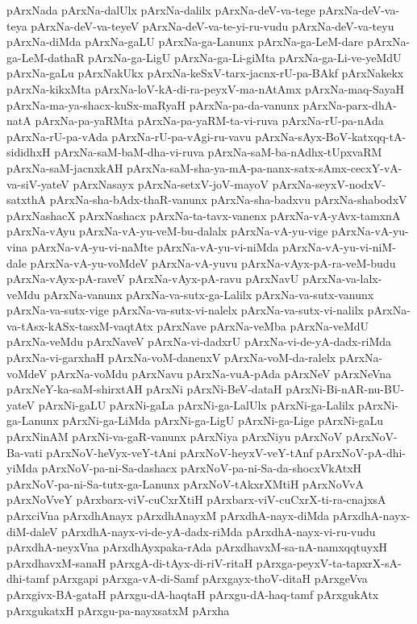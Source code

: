 {pArxNada
pArxNa-dalUlx
pArxNa-dalilx
pArxNa-deV-va-tege
pArxNa-deV-va-teya
pArxNa-deV-va-teyeV
pArxNa-deV-va-te-yi-ru-vudu
pArxNa-deV-va-teyu
pArxNa-diMda
pArxNa-gaLU
pArxNa-ga-Lanunx
pArxNa-ga-LeM-dare
pArxNa-ga-LeM-dathaR
pArxNa-ga-LigU
pArxNa-ga-Li-giMta
pArxNa-ga-Li-ve-yeMdU
pArxNa-gaLu
pArxNakUkx
pArxNa-keSxV-tarx-jacnx-rU-pa-BAkf
pArxNakekx
pArxNa-kikxMta
pArxNa-loV-kA-di-ra-peyxV-ma-nAtAmx
pArxNa-maq-SayaH
pArxNa-ma-ya-shacx-kuSx-maRyaH
pArxNa-pa-da-vanunx
pArxNa-parx-dhA-natA
pArxNa-pa-yaRMta
pArxNa-pa-yaRM-ta-vi-ruva
pArxNa-rU-pa-nAda
pArxNa-rU-pa-vAda
pArxNa-rU-pa-vAgi-ru-vavu
pArxNa-sAyx-BoV-katxqq-tA-sididhxH
pArxNa-saM-baM-dha-vi-ruva
pArxNa-saM-ba-nAdhx-tUpxvaRM
pArxNa-saM-jacnxkAH
pArxNa-saM-sha-ya-mA-pa-nanx-satx-sAmx-cecxY-vA-va-siV-yateV
pArxNasayx
pArxNa-setxV-joV-mayoV
pArxNa-seyxV-nodxV-satxthA
pArxNa-sha-bAdx-thaR-vanunx
pArxNa-sha-badxvu
pArxNa-shabodxV
pArxNashacX
pArxNashacx
pArxNa-ta-tavx-vanenx
pArxNa-vA-yAvx-tamxnA
pArxNa-vAyu
pArxNa-vA-yu-veM-bu-dalalx
pArxNa-vA-yu-vige
pArxNa-vA-yu-vina
pArxNa-vA-yu-vi-naMte
pArxNa-vA-yu-vi-niMda
pArxNa-vA-yu-vi-niM-dale
pArxNa-vA-yu-voMdeV
pArxNa-vA-yuvu
pArxNa-vAyx-pA-ra-veM-budu
pArxNa-vAyx-pA-raveV
pArxNa-vAyx-pA-ravu
pArxNavU
pArxNa-va-lalx-veMdu
pArxNa-vanunx
pArxNa-va-sutx-ga-Lalilx
pArxNa-va-sutx-vanunx
pArxNa-va-sutx-vige
pArxNa-va-sutx-vi-nalelx
pArxNa-va-sutx-vi-nalilx
pArxNa-va-tAsx-kASx-tasxM-vaqtAtx
pArxNave
pArxNa-veMba
pArxNa-veMdU
pArxNa-veMdu
pArxNaveV
pArxNa-vi-dadxrU
pArxNa-vi-de-yA-dadx-riMda
pArxNa-vi-garxhaH
pArxNa-voM-danenxV
pArxNa-voM-da-ralelx
pArxNa-voMdeV
pArxNa-voMdu
pArxNavu
pArxNa-vuA-pAda
pArxNeV
pArxNeVna
pArxNeY-ka-saM-shirxtAH
pArxNi
pArxNi-BeV-dataH
pArxNi-Bi-nAR-nu-BU-yateV
pArxNi-gaLU
pArxNi-gaLa
pArxNi-ga-LalUlx
pArxNi-ga-Lalilx
pArxNi-ga-Lanunx
pArxNi-ga-LiMda
pArxNi-ga-LigU
pArxNi-ga-Lige
pArxNi-gaLu
pArxNinAM
pArxNi-va-gaR-vanunx
pArxNiya
pArxNiyu
pArxNoV
pArxNoV-Ba-vati
pArxNoV-heVyx-veY-tAni
pArxNoV-heyxV-veY-tAnf
pArxNoV-pA-dhi-yiMda
pArxNoV-pa-ni-Sa-dashacx
pArxNoV-pa-ni-Sa-da-shocxVkAtxH
pArxNoV-pa-ni-Sa-tutx-ga-Lanunx
pArxNoV-tAkxrXMtiH
pArxNoVvA
pArxNoVveY
pArxbarx-viV-cuCxrXtiH
pArxbarx-viV-cuCxrX-ti-ra-cnajxsA
pArxciVna
pArxdhAnayx
pArxdhAnayxM
pArxdhA-nayx-diMda
pArxdhA-nayx-diM-daleV
pArxdhA-nayx-vi-de-yA-dadx-riMda
pArxdhA-nayx-vi-ru-vudu
pArxdhA-neyxVna
pArxdhAyxpaka-rAda
pArxdhavxM-sa-nA-namxqqtuyxH
pArxdhavxM-sanaH
pArxgA-di-tAyx-di-riV-ritaH
pArxga-peyxV-ta-tapxrX-sA-dhi-tamf
pArxgapi
pArxga-vA-di-Samf
pArxgayx-thoV-ditaH
pArxgeVva
pArxgivx-BA-gataH
pArxgu-dA-haqtaH
pArxgu-dA-haq-tamf
pArxgukAtx
pArxgukatxH
pArxgu-pa-nayxsatxM
pArxha
}
